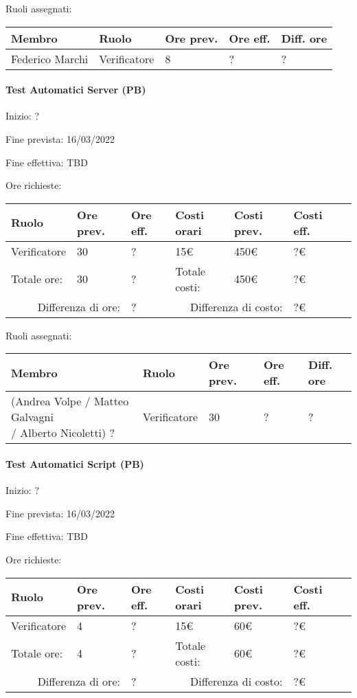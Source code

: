 \documentclass[a4paper, 12pt]{article}
\begin{document}
Ruoli assegnati:\\[0.5em]
\begin{tabular}{|l|l|l|l|l|}\hline
Membro & Ruolo & Ore prev. & Ore eff. & Diff. ore \\\hline
Federico Marchi & Verificatore & 8 & ? & ? \\\hline
\end{tabular}

\paragraph{Test Automatici Server (PB)}
Inizio: ?\par
Fine prevista: 16/03/2022\par
Fine effettiva: TBD

Ore richieste:\\[0.5em]
\begin{tabular}{|l|l|l||l|l|l|l|}\hline
Ruolo & Ore prev. & Ore eff. & Costi orari & Costi prev. & Costi eff.\\\hline
Verificatore & 30 & ? & 15\euro & 450\euro & ?\euro \\\hline
Totale ore: & 30 & ? & Totale costi: & 450\euro & ?\euro \\\hline
\multicolumn{2}{|r|}{Differenza di ore:} & ? & \multicolumn{2}{r|}{Differenza di costo:} & ?\euro \\\hline
\end{tabular}

Ruoli assegnati:\\[0.5em]
\begin{tabular}{|l|l|l|l|l|}\hline
Membro & Ruolo & Ore prev. & Ore eff. & Diff. ore \\\hline
\pbox{20cm}{(Andrea Volpe / Matteo Galvagni\\ / Alberto Nicoletti) ?} & Verificatore & 30 & ? & ? \\\hline
\end{tabular}

\paragraph{Test Automatici Script (PB)}
Inizio: ?\par
Fine prevista: 16/03/2022\par
Fine effettiva: TBD

Ore richieste:\\[0.5em]
\begin{tabular}{|l|l|l||l|l|l|l|}\hline
Ruolo & Ore prev. & Ore eff. & Costi orari & Costi prev. & Costi eff.\\\hline
Verificatore & 4 & ? & 15\euro & 60\euro & ?\euro \\\hline
Totale ore: & 4 & ? & Totale costi: & 60\euro & ?\euro \\\hline
\multicolumn{2}{|r|}{Differenza di ore:} & ? & \multicolumn{2}{r|}{Differenza di costo:} & ?\euro \\\hline
\end{tabular}
\end{document}
